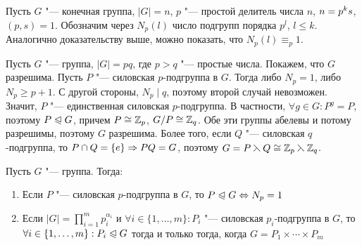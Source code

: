 \begin{note}
	Пусть $G$ "--- конечная группа, $|G| = n$, $p$ "--- простой делитель числа $n$, $n \hm= p^ks$, $(p, s) = 1$. Обозначим через $N_p(l)$ число подгрупп порядка $p^l$, $l \le k$. Аналогично доказательству выше, можно показать, что $N_p(l) \equiv_p 1$.
\end{note}

\begin{example}
	Пусть $G$ "--- группа, $|G| = pq$, где $p > q$ "--- простые числа. Покажем, что $G$ разрешима. Пусть $P$ "--- силовская $p$-подгруппа в $G$. Тогда либо $N_p = 1$, либо $N_p \ge p + 1$. С другой стороны, $N_p\mid q$, поэтому второй случай невозможен. Значит, $P$ "--- единственная силовская $p$-подгруппа. В частности, $\forall g \in G: P^g = P$, поэтому $P \trianglelefteqslant G$, причем $P \cong \mathbb{Z}_p$, $G / P \cong \mathbb{Z}_q$. Обе эти группы абелевы и потому разрешимы, поэтому $G$ разрешима. Более того, если $Q$ "--- силовская $q$-подгруппа, то $P \cap Q = \{e\} \Rightarrow PQ = G$, поэтому $G = P \leftthreetimes Q \cong \mathbb{Z}_p \leftthreetimes \mathbb{Z}_q$.
\end{example}

\begin{theorem} Пусть $G$ "--- группа. Тогда:
	\begin{enumerate}
		\item Если $P$ "--- силовская $p$-подгруппа в $G$, то $P \normal G \hm\lra N_p = 1$
		\item Если $|G| = \prod_{i = 1}^mp_i^{\alpha_i}$ и $\forall i \in \{1, \dotsc, m\}: P_i$ "--- силовская $p_i$-подгруппа в $G$, то $\forall i \hm\in \{1, \dotsc, m\}: P_i \normal G$ тогда и только тогда, когда $G = P_1 \times \dotsb \times P_m$
	\end{enumerate}
\end{theorem}

